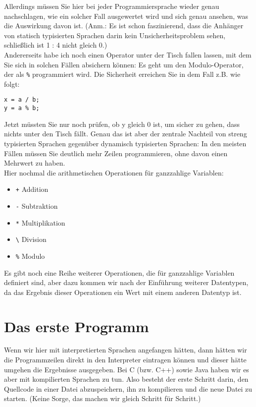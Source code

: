 Allerdings müssen Sie hier bei jeder Programmiersprache wieder genau nachschlagen, wie ein solcher Fall ausgewertet wird und sich genau ansehen, was die Auswirkung davon ist. (Anm.: Es ist schon faszinierend, dass die Anhänger von statisch typisierten Sprachen darin kein Unsicherheitsproblem sehen, schließlich ist 1 : 4 nicht gleich 0.)\\

Andererseits habe ich noch einen Operator unter der Tisch fallen lassen, mit dem Sie sich in solchen Fällen absichern können: Es geht um den Modulo-Operator, der als \verb|%| programmiert wird. Die Sicherheit erreichen Sie in dem Fall z.B. wie folgt:

\begin{verbatim}
x = a / b;
y = a % b;
\end{verbatim}

Jetzt müssten Sie nur noch prüfen, ob y gleich 0 ist, um sicher zu gehen, dass \glqq{}nichts unter den Tisch fällt\grqq{}. Genau das ist aber der zentrale Nachteil von streng typisierten Sprachen gegenüber dynamisch typisierten Sprachen: In den meisten Fällen müssen Sie deutlich mehr Zeilen programmieren, ohne davon einen Mehrwert zu haben.\\

Hier nochmal die arithmetischen Operationen für ganzzahlige Variablen:

\begin{itemize}
	\item \verb|+| Addition
	\item \verb|-| Subtraktion
	\item \verb|*| Multiplikation
	\item \verb|\| Division
	\item \verb|%| Modulo
\end{itemize}

Es gibt noch eine Reihe weiterer Operationen, die für ganzzahlige Variablen definiert sind, aber dazu kommen wir nach der Einführung weiterer Datentypen, da das Ergebnis dieser Operationen ein Wert mit einem anderen Datentyp ist.

\section{Das erste Programm}

Wenn wir hier mit interpretierten Sprachen angefangen hätten, dann hätten wir die Programmzeilen direkt in den Interpreter eintragen können und dieser hätte umgehen die Ergebnisse ausgegeben. Bei C (bzw. C++) sowie Java haben wir es aber mit kompilierten Sprachen zu tun. Also besteht der erste Schritt darin, den Quellcode in einer Datei abzuspeichern, ihn zu kompilieren und die neue Datei zu starten. (Keine Sorge, das machen wir gleich Schritt für Schritt.)\\

